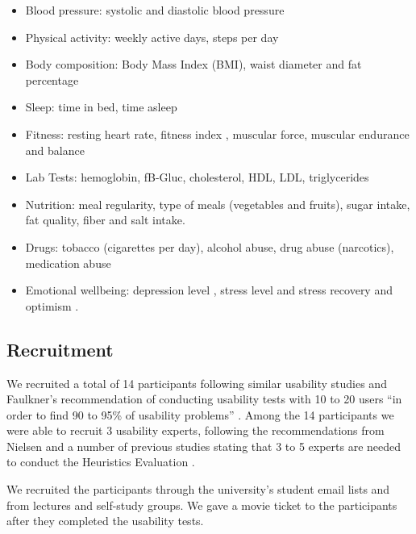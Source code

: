 \documentclass[twocolumn]{bmcart}%
\begin{document}
\begin{itemize}
	\item Blood pressure: systolic and diastolic blood pressure 
    \item Physical activity: weekly active days\cite{us2008physical, physical2008physical}, steps per day \cite{tudor2004many} 
    \item Body composition: Body Mass Index (BMI), waist diameter and fat percentage
    \item Sleep: time in bed, time asleep  
    \item Fitness: resting heart rate, fitness index \cite{oja2013tester,laukkanen1992validity}, muscular force, muscular endurance and balance \cite{suni2009fitness}
    \item Lab Tests: hemoglobin, fB-Gluc, cholesterol, HDL, LDL, triglycerides 
    \item Nutrition: meal regularity, type of meals (vegetables and fruits), sugar intake, fat quality, fiber and salt intake.
    \item Drugs: tobacco (cigarettes per day), alcohol abuse, drug abuse (narcotics), medication abuse
    \item Emotional wellbeing: depression level \cite{poutanen2010validity}, stress level and stress recovery \cite{firstbeat2014, teisala2014associations} and optimism \cite{scheier1994distinguishing}.
\end{itemize}	

\subsection*{Recruitment}

We recruited a total of 14 participants following similar usability studies and Faulkner's \cite{faulkner2003beyond} recommendation of conducting usability tests with 10 to 20 users ``in order to find 90 to 95\% of usability problems'' \cite{berry2015usability}. Among the 14 participants we were able to recruit 3 usability experts, following the recommendations from Nielsen and a number of previous studies stating that 3 to 5 experts are needed to conduct the Heuristics Evaluation \cite{johnson2011ehr, zhang2003using, nielsen1994usability, shneiderman1992designing, molich1990improving, Tognazzini2014principles}.

We recruited the participants through the university's student email lists and from lectures and self-study groups. We gave a movie ticket to the participants after they completed the usability tests.
\end{document}
